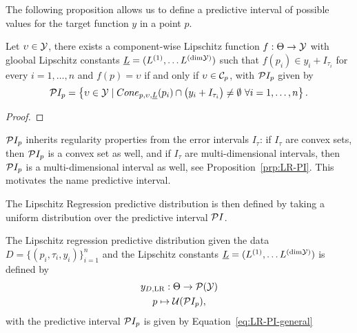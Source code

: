 The following proposition allows us to define a predictive interval of possible values for the target function $y$ in a point $p$.
\begin{prp}
    Let $\upsilon \in \mathcal Y$, there exists a component-wise Lipschitz function $f: \Theta \rightarrow \mathcal Y$ with gloobal Lipschitz constants $\underline L = (L^{(1)},\dots L^{(\text{dim}\mathcal Y)} )$ such that $f(p_i) \in y_i + I_{\tau_i}$ for every $i = 1, \dots, n$ and $f(p) = \upsilon$ if and only if $\upsilon \in \mathcal C_p$, with $\mathcal PI_p$ given by
    \begin{equation}\label{eq:LR-PI-general}
        \mathcal PI_p = \left \{ \upsilon \in \mathcal Y \mid Cone_{p,\upsilon,\underline L}(p_i) \cap  \big ( y_i + I_{\tau_i} \big ) \neq \emptyset \ \forall i = 1, \dots, n \right \}.
    \end{equation}
\end{prp}
\begin{proof}
\end{proof}
\begin{rmk}
    $\mathcal PI_p$ inherits regularity properties from the error intervals $I_\tau$: if $I_\tau$ are convex sets, then $\mathcal PI_p$ is a convex set as well, and if $I_\tau$ are multi-dimensional intervals, then $\mathcal PI_p$ is a multi-dimensional interval as well, see Proposition~\ref{prp:LR-PI}. 
    This motivates the name predictive interval. 
\end{rmk}

The Lipschitz Regression predictive distribution is then defined by taking a uniform distribution over the predictive interval $\mathcal P I$.
\begin{dfn}  \label{dfn:LR}
    The Lipschitz regression predictive distribution given the data $D=\{ (p_i, \tau_i, y_i) \}_{i=1}^n$ and the Lipschitz constants $\underline{L} = (L^{(1)},\dots L^{(\text{dim}\mathcal Y)})$ is defined by
    \begin{gather*}
        y_{D, \text{LR}} : \Theta \rightarrow \mathcal P( \mathcal Y) \\
        p \mapsto \mathcal U( \mathcal PI_p ),
    \end{gather*}
    with the predictive interval $\mathcal PI_p$ is given by Equation~\eqref{eq:LR-PI-general}
\end{dfn}

